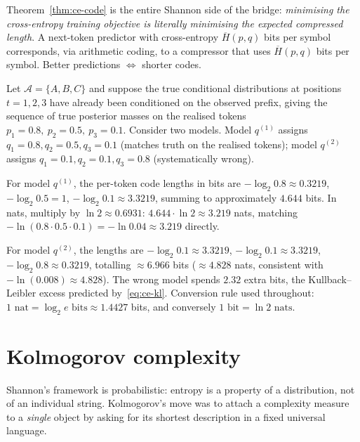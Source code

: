 Theorem~\ref{thm:ce-code} is the entire Shannon side of the bridge:
\emph{minimising the cross-entropy training objective is literally
minimising the expected compressed length}. A next-token predictor
with cross-entropy $\overline{H}(p,q)$ bits per symbol corresponds,
via arithmetic coding, to a compressor that uses
$\overline{H}(p,q)$ bits per symbol. Better predictions $\Leftrightarrow$
shorter codes.

\begin{example}
\label{ex:ce3}
Let $\mathcal{A} = \{A,B,C\}$ and suppose the true conditional
distributions at positions $t=1,2,3$ have already been conditioned on
the observed prefix, giving the sequence of true posterior masses on
the realised tokens
$p_1 = 0.8,\ p_2 = 0.5,\ p_3 = 0.1$.
Consider two models. Model $q^{(1)}$ assigns
$q_1 = 0.8, q_2 = 0.5, q_3 = 0.1$ (matches truth on the realised tokens);
model $q^{(2)}$ assigns $q_1 = 0.1, q_2 = 0.1, q_3 = 0.8$ (systematically
wrong).

For model $q^{(1)}$, the per-token code lengths in bits are
$-\log_2 0.8 \approx 0.3219$, $-\log_2 0.5 = 1$,
$-\log_2 0.1 \approx 3.3219$, summing to approximately $4.644$ bits.
In nats, multiply by $\ln 2 \approx 0.6931$: $4.644 \cdot \ln 2
\approx 3.219$ nats, matching
$-\ln(0.8 \cdot 0.5 \cdot 0.1) = -\ln 0.04 \approx 3.219$ directly.

For model $q^{(2)}$, the lengths are
$-\log_2 0.1 \approx 3.3219$, $-\log_2 0.1 \approx 3.3219$,
$-\log_2 0.8 \approx 0.3219$, totalling $\approx 6.966$ bits
($\approx 4.828$ nats, consistent with $-\ln(0.008) \approx 4.828$).
The wrong model spends $2.32$ extra bits, the Kullback--Leibler excess
predicted by~\eqref{eq:ce-kl}. Conversion rule used throughout:
$1 \text{ nat} = \log_2 e \text{ bits} \approx 1.4427$ bits, and
conversely $1 \text{ bit} = \ln 2 \text{ nats}$.
\end{example}

\section{Kolmogorov complexity}
\label{sec:kolmogorov}

Shannon's framework is probabilistic: entropy is a property of a
distribution, not of an individual string. Kolmogorov's move
\citep{kolmogorov1965three} was to attach a complexity measure to a
\emph{single} object by asking for its shortest description in a fixed
universal language.


